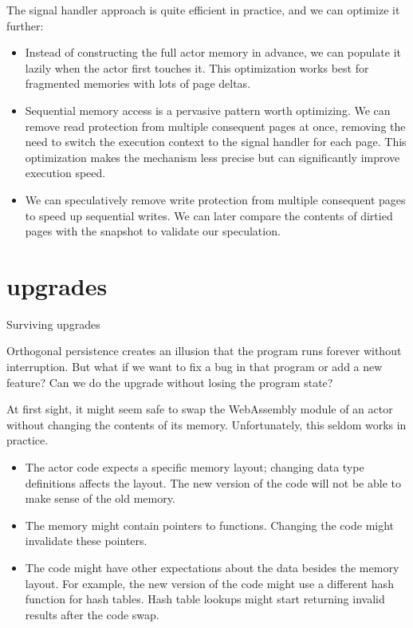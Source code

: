 \documentclass{article}
\begin{document}
The signal handler approach is quite efficient in practice, and we can optimize it further:
\begin{itemize}
  \item
    Instead of constructing the full actor memory in advance, we can populate it lazily when the actor first touches it.
    This optimization works best for fragmented memories with lots of page deltas.
  \item
    Sequential memory access is a pervasive pattern worth optimizing.
    We can remove read protection from multiple consequent pages at once, removing the need to switch the execution context to the signal handler for each page.
    This optimization makes the mechanism less precise but can significantly improve execution speed.
  \item
    We can speculatively remove write protection from multiple consequent pages to speed up sequential writes.
    We can later compare the contents of dirtied pages with the snapshot to validate our speculation.
\end{itemize}

\section{upgrades}{Surviving upgrades}

Orthogonal persistence creates an illusion that the program runs forever without interruption.
But what if we want to fix a bug in that program or add a new feature?
Can we do the upgrade without losing the program state?

At first sight, it might seem safe to swap the WebAssembly module of an actor without changing the contents of its memory.
Unfortunately, this seldom works in practice.

\begin{itemize}
  \item
    The actor code expects a specific memory layout; changing data type definitions affects the layout.
    The new version of the code will not be able to make sense of the old memory.
  \item
    The memory might contain pointers to functions.
    Changing the code might invalidate these pointers.
  \item
    The code might have other expectations about the data besides the memory layout.
    For example, the new version of the code might use a different hash function for hash tables.
    Hash table lookups might start returning invalid results after the code swap.
\end{itemize}
\end{document}
